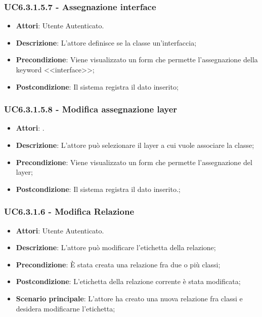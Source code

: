 \subsubsection{UC6.3.1.5.7 - Assegnazione interface} 
\label{sssec:UC6.3.1.5.7} 
\begin{itemize} 
\item \textbf{Attori}: Utente Autenticato.
\item \textbf{Descrizione}: L'attore definisce se la classe un'interfaccia;
\item \textbf{Precondizione}: Viene visualizzato un form che permette l'assegnazione della keyword <<interface>>;
\item \textbf{Postcondizione}: Il sistema registra il dato inserito;
\end{itemize} 
\subsubsection{UC6.3.1.5.8 - Modifica assegnazione layer} 
\label{sssec:UC6.3.1.5.8} 
\begin{itemize} 
\item \textbf{Attori}: .
\item \textbf{Descrizione}: L'attore può selezionare il layer a cui vuole associare la classe;
\item \textbf{Precondizione}: Viene visualizzato un form che permette l'assegnazione del layer;
\item \textbf{Postcondizione}: Il sistema registra il dato inserito.;
\end{itemize} 
\subsubsection{UC6.3.1.6 - Modifica Relazione} 
\label{sssec:UC6.3.1.6} 
\begin{itemize} 
\item \textbf{Attori}: Utente Autenticato.
\item \textbf{Descrizione}: L'attore può modificare l'etichetta della relazione;
\item \textbf{Precondizione}: È stata creata una relazione fra due o più classi;
\item \textbf{Postcondizione}: L'etichetta della relazione corrente è stata modificata;
\item \textbf{Scenario principale}: L'attore ha creato una nuova relazione fra classi e desidera modificarne l'etichetta;\end{itemize} 
